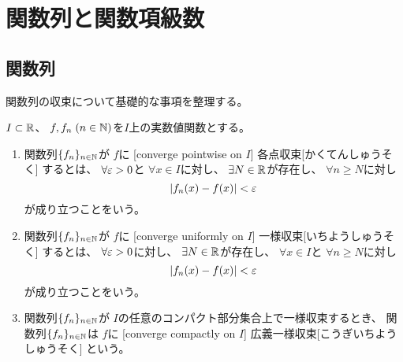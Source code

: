 \documentclass[report]{jlreq}
\begin{document}
%
\chapter{関数列と関数項級数}

%
\section{関数列}

関数列の収束について基礎的な事項を整理する。


\begin{definition}
    $I \subset \mathbb{R}$、
    $f, f_n \; (n \in \mathbb{N})$を$I$上の実数値関数とする。
    \begin{enumerate}
        \item 関数列$\{ f_n \}_{n \in \mathbb{N}}$が
            $f$に
            [converge pointwise on $I$]
                {各点収束}[かくてんしゅうそく]
            するとは、
            $\forall \varepsilon > 0$と
            $\forall x \in I$に対し、
            $\exists N \in \mathbb{R}$が存在し、
            $\forall n \ge N$に対し
            \begin{equation}
                |f_n(x) - f(x)| < \varepsilon
            \end{equation}
            が成り立つことをいう。
        \item 関数列$\{ f_n \}_{n \in \mathbb{N}}$が
            $f$に
            [converge uniformly on $I$]
                {一様収束}[いちようしゅうそく]
            するとは、
            $\forall \varepsilon > 0$に対し、
            $\exists N \in \mathbb{R}$が存在し、
            $\forall x \in I$と
            $\forall n \ge N$に対し
            \begin{equation}
                |f_n(x) - f(x)| < \varepsilon
            \end{equation}
            が成り立つことをいう。
        \item 関数列$\{ f_n \}_{n \in \mathbb{N}}$が
            $I$の任意のコンパクト部分集合上で一様収束するとき、
            関数列$\{ f_n \}_{n \in \mathbb{N}}$は
            $f$に
            [converge compactly on $I$]
                {広義一様収束}[こうぎいちようしゅうそく]
            という。
    \end{enumerate}
\end{definition}
\end{document}
